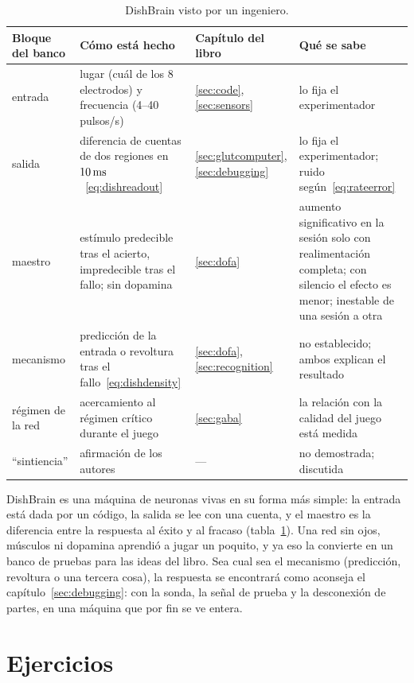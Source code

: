 \begin{table}[t]
\centering
\footnotesize
\setlength{\tabcolsep}{4pt}
\renewcommand{\arraystretch}{1.15}
\begin{tabular}{>{\raggedright}p{2.1cm}>{\raggedright}p{4.2cm}>{\raggedright}p{1.9cm}>{\raggedright\arraybackslash}p{4.6cm}}
\toprule
Bloque del banco & Cómo está hecho & Capítulo del libro & Qué se sabe \\
\midrule
entrada & lugar (cuál de los 8 electrodos) y frecuencia (4--40 pulsos/s) & \ref{sec:code}, \ref{sec:sensors} & lo fija el experimentador \\
salida & diferencia de cuentas de dos regiones en $10\,\text{ms}$~\eqref{eq:dishreadout} & \ref{sec:glutcomputer}, \ref{sec:debugging} & lo fija el experimentador; ruido según~\eqref{eq:rateerror} \\
maestro & estímulo predecible tras el acierto, impredecible tras el fallo; sin dopamina & \ref{sec:dofa} & aumento significativo en la sesión solo con realimentación completa; con silencio el efecto es menor; inestable de una sesión a otra \\
mecanismo & predicción de la entrada o revoltura tras el fallo~\eqref{eq:dishdensity} & \ref{sec:dofa}, \ref{sec:recognition} & no establecido; ambos explican el resultado \\
régimen de la red & acercamiento al régimen crítico durante el juego & \ref{sec:gaba} & la relación con la calidad del juego está medida \\
“sintiencia” & afirmación de los autores & --- & no demostrada; discutida \\
\bottomrule
\end{tabular}
\caption{DishBrain visto por un ingeniero.}
\label{tab:dishbrain}
\end{table}

DishBrain es una máquina de neuronas vivas en su forma más simple: la entrada está dada por un código, la salida se lee con una cuenta, y el maestro es la diferencia entre la respuesta al éxito y al fracaso (tabla~\ref{tab:dishbrain}). Una red sin ojos, músculos ni dopamina aprendió a jugar un poquito, y ya eso la convierte en un banco de pruebas para las ideas del libro. Sea cual sea el mecanismo (predicción, revoltura o una tercera cosa), la respuesta se encontrará como aconseja el capítulo~\ref{sec:debugging}: con la sonda, la señal de prueba y la desconexión de partes, en una máquina que por fin se ve entera.

\section{Ejercicios}

